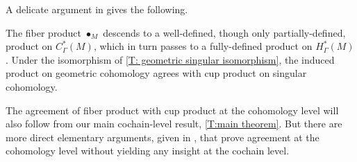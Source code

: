 A delicate argument in \cite{medina2022foundations} gives the following.

\begin{theorem}\label{P: product}
	The fiber product $\bullet_M$ descends to a well-defined, though only partially-defined, product on $C_\Gamma^*(M)$, which in turn passes to a fully-defined product on $H_\Gamma^*(M)$. Under the isomorphism of \cref{T: geometric singular isomorphism}, the induced product on geometric cohomology agrees with cup product on singular cohomology.
\end{theorem}

The agreement of fiber product with cup product at the cohomology level will also follow from our main cochain-level result, \cref{T:main theorem}.
But there are more direct elementary arguments, given in \cite{medina2022foundations}, that prove agreement at the cohomology level without yielding any insight at the cochain level.